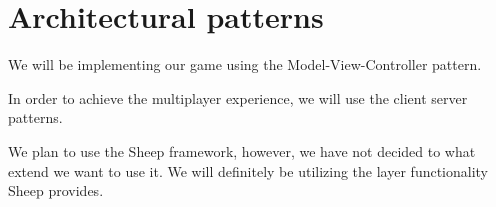 \section{Architectural patterns} 
\label{architecturalpatterns}

We will be implementing our game using the Model-View-Controller pattern. 

In order to achieve the multiplayer experience, we will use the client server patterns.

We plan to use the Sheep framework, however, we have not decided to what extend we want to use it. We will definitely be utilizing the layer functionality Sheep provides.